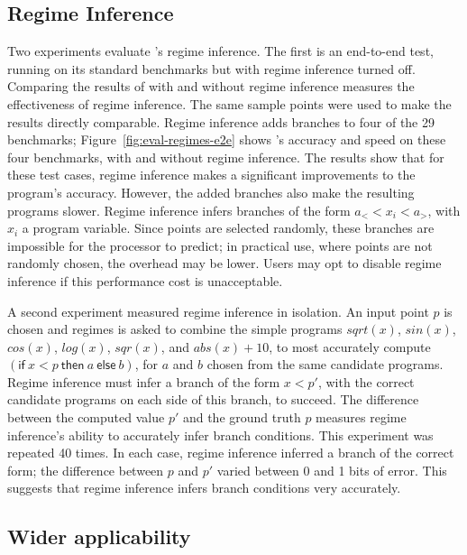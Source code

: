 \documentclass[paper.tex]{subfiles}
\begin{document}
\subsection{Regime Inference} \label{sec:eval-regimes}

Two experiments evaluate \casio's regime inference.  The first is an
end-to-end test, running \casio on its standard benchmarks but with
regime inference turned off.
Comparing the results of \casio with and
without regime inference measures the effectiveness of regime
inference.
The same sample points were used to make the results directly comparable.
Regime inference adds branches to four of the 29
benchmarks; Figure~\ref{fig:eval-regimes-e2e} shows \casio's accuracy
and speed on these four benchmarks, with and without regime
inference.  The results show that for these test cases, regime
inference makes a significant improvements to the program's accuracy.
However, the added branches also make the resulting programs slower.
Regime inference infers branches of the form $a_< < x_i < a_>$, with
$x_i$ a program variable.
Since points are selected randomly, these branches are
impossible for the processor to predict;
in practical use, where points are not randomly chosen,
the overhead may be lower.
Users may opt to disable regime inference if this performance cost is unacceptable.

A second experiment measured regime inference in isolation.
An input point $p$ is chosen and regimes is asked to combine the simple
programs $sqrt(x)$, $sin(x)$, $cos(x)$, $log(x)$, $sqr(x)$,
and $abs(x) + 10$, to most accurately compute $(\mathsf{if}\:x <
p\:\mathsf{then}\:a\:\mathsf{else}\:b)$, for $a$ and $b$ chosen from
the same candidate programs.  Regime inference must infer a branch of the
form $x < p'$, with the correct candidate programs on each side of
this branch, to succeed.
The difference between the computed value $p'$ and
the ground truth $p$ measures regime inference's ability to accurately
infer branch conditions.  This experiment was repeated 40 times.  In
each case, regime inference inferred a branch of the correct form; the
difference between $p$ and $p'$ varied between 0 and 1 bits of error.
This suggests that regime inference infers branch conditions very
accurately.

\subsection{Wider applicability}
\end{document}
